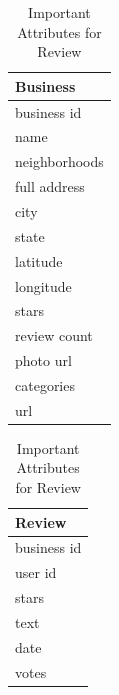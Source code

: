 \documentclass[paper=letter, fontsize=15pt]{article} %
\begin{document}
\begin{table}[h!]%
\begin{minipage}{.5\linewidth}
\centering
\begin{tabular}{|l|}
\hline
\textbf{Business} \\\hline
business id\\\hline
name\\\hline
neighborhoods\\\hline
full address\\\hline
city\\\hline
state\\\hline
latitude\\\hline
longitude\\\hline
stars\\\hline
review count\\\hline
photo url\\\hline
categories\\\hline
url\\\hline
\end{tabular}
\caption{Important Attributes for Business }
\end{minipage}
\label{}
\begin{minipage}{.5\linewidth}
\centering
\begin{tabular}{|l|}
\hline
\textbf{Review} \\\hline
business id\\\hline
user id\\\hline
stars\\\hline
text\\\hline
date\\\hline
votes\\\hline
\end{tabular}
\caption{Important Attributes for Review }
\end{minipage}
\label{}
\end{table}
\end{document}
